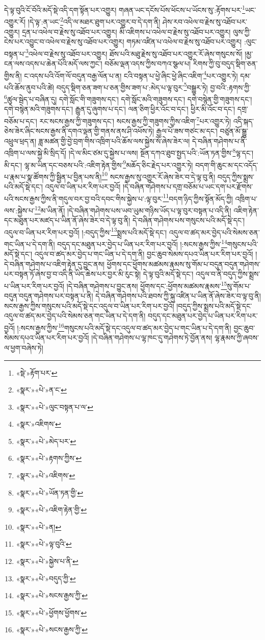 དེ་ལྟ་བུའི་ངོ་བོའི་མདོ་སྡེ་འདི་དག་སྟོན་པར་འགྱུར། གཞན་ཡང་དངོས་པོས་ཕོངས་པ་ཡོངས་སུ་:རྟོགས་པར་\footnote{«སྡེ་»རྟོག་པར་}ཡང་འགྱུར་རོ། །དེ་ལྟ་:ན་ཡང་\footnote{«སྣར་»«པེ་»ན་ང་}འདི་ལ་མཐར་ཐུག་པར་འགྱུར་བ་དེ་དག་ནི། ཤེས་རབ་འཕེལ་བ་རྗེས་སུ་འཐོབ་པར་འགྱུར། དྲན་པ་འཕེལ་བ་རྗེས་སུ་འཐོབ་པར་འགྱུར། མི་འཇིགས་པ་འཕེལ་བ་རྗེས་སུ་འཐོབ་པར་འགྱུར། ལུས་ཀྱི་ངེས་པར་འབྱུང་བ་འཕེལ་བ་རྗེས་སུ་འཐོབ་པར་འགྱུར། གཏམ་འཛིན་པ་འཕེལ་བ་རྗེས་སུ་འཐོབ་པར་འགྱུར། :ལུང་བསྟན་པ་\footnote{«སྣར་»«པེ་»ལུང་བསྟན་པ་ལ་}འཕེལ་བ་རྗེས་སུ་འཐོབ་པར་འགྱུར། ཐོས་པའི་མཐུ་རྗེས་སུ་འཐོབ་པར་འགྱུར་རོ་ཞེས་གསུངས་སོ། །མྱ་ངན་ལས་འདས་པ་ཆེན་པོའི་མདོ་ལས་ཀྱང་། བཅོམ་ལྡན་འདས་ཀྱིས་བཀའ་སྩལ་པ། རིགས་ཀྱི་བུ་བདུད་སྡིག་ཅན་གྱིས་ནི། ང་འདས་པའི་འོག་ལོ་བདུན་བརྒྱ་ལོན་པ་ན། ངའི་བསྟན་པ་ཕྱེ་ཞིང་ཕྱེ་ཞིང་འཇིག་\footnote{«སྣར་»འཇིགས་}པར་འགྱུར་ཏེ། དམ་པའི་ཆོས་ནུབ་པའི་ཚེ། བདུད་སྡིག་ཅན་ཟག་པ་ཅན་གྱིས་ཟག་པ་:མེད་པ་ལྟ་བུར་\footnote{«སྣར་»«པེ་»མེད་པར་}བསྒྱུར་ཏེ། བྱ་བའི་:རྟགས་ཀྱི་\footnote{«སྣར་»«པེ་»རྟགས་ཀྱིས་}ཚུལ་སྦེད་པ་བཞིན་དུ། དགེ་སློང་གི་གཟུགས་དང་། དགེ་སློང་མའི་གཟུགས་དང་། དགེ་བསྙེན་གྱི་གཟུགས་དང་། དགེ་བསྙེན་མའི་གཟུགས་དང་། རྒྱུན་དུ་ཞུགས་པ་དང་། ལན་ཅིག་ཕྱིར་འོང་བ་དང་། ཕྱིར་མི་འོང་བ་དང་། དགྲ་བཅོམ་པ་དང་། རང་སངས་རྒྱས་ཀྱི་གཟུགས་དང་། སངས་རྒྱས་ཀྱི་གཟུགས་ཀྱིས་འཇིག་\footnote{«སྣར་»«པེ་»འཇིགས་}པར་འགྱུར་ཏེ། འདི་སྐད་ཅེས་ཟེར་ཞིང་སངས་རྒྱས་ནི་དགའ་ལྡན་གྱི་གནས་ནས་ཤི་འཕོས་ཏེ། རྒྱལ་པོ་ཟས་གཙང་མ་དང་། བཙུན་མོ་སྒྱུ་འཕྲུལ་ཕྲད་ན། ཟླ་མཚན་གྱི་བྱེ་བྲག་གིས་འཁྲིག་པའི་ཆོས་ལས་སྐྱེས་སོ་ཞེས་ཟེར་ལ། དེ་བཞིན་གཤེགས་པ་ནི་འཁྲིག་པ་ལས་སྐྱེ་མི་སྲིད་དོ། །དེ་ལ་མིང་ཙམ་དུ་སྐྱེས་པ་ལས། སྔོན་དཀའ་ཐུབ་སྤྱད་པའི་:ཡོན་ཏན་གྱིས་\footnote{«སྣར་»«པེ་»ཡོན་ཏན་གྱི་}ལྷ་དང་། མི་དང་། ལྷ་མ་ཡིན་དང་བཅས་པའི་:འཇིག་རྟེན་གྱིས་\footnote{«སྣར་»«པེ་»འཇིག་རྟེན་གྱི་}མཆོད་ཅིང་རྗེད་པར་འགྱུར་ཏེ། བདག་གི་ཆུང་མ་དང་འདོད་པ་རྣམ་པ་སྣ་ཚོགས་ཀྱི་སྦྱིན་པ་བྱིན་པས་ནི།\footnote{«སྣར་»«པེ་»ན།} སངས་རྒྱས་སུ་འགྱུར་རོ་ཞེས་ཟེར་བ་དེ་ལྟ་བུ་ནི། བདུད་ཀྱིས་སྨྲས་པའི་མདོ་སྡེ་དང་། འདུལ་བ་ཡིན་པར་རིག་པར་བྱའོ། །དེ་བཞིན་གཤེགས་པ་དགྲ་བཅོམ་པ་ཡང་དག་པར་རྫོགས་པའི་སངས་རྒྱས་ཀྱིས་ནི་གདུལ་བར་བྱ་བའི་དབང་གིས་སྐྱེས་པ་:ལྟ་བུར་\footnote{«སྣར་»«པེ་»ལྟ་བུའི་}བདག་ཉིད་ཀྱིས་སྟོན་མོད་ཀྱི། འཁྲིག་པ་ལས་:སྐྱེས་པ་\footnote{«སྣར་»«པེ་»སྐྱེས་པ་ནི་}མ་ཡིན་ནོ། །དེ་བཞིན་གཤེགས་པས་ཡབ་ཡུམ་གཉིས་ཡོད་པ་ལྟ་བུར་བསྟན་པ་འདི་ནི། འཇིག་རྟེན་དང་མཐུན་པར་མཛད་པ་ཡིན་ནོ་ཞེས་ཟེར་བ་དེ་ལྟ་བུ་ནི། དེ་བཞིན་གཤེགས་པས་གསུངས་པའི་མདོ་སྡེ་དང་། འདུལ་བ་ཡིན་པར་རིག་པར་བྱའོ། །:བདུད་ཀྱིས་\footnote{«སྣར་»«པེ་»བདུད་ཀྱི་}སྨྲས་པའི་མདོ་སྡེ་དང་། འདུལ་བ་ཚད་མར་བྱེད་པའི་སེམས་ཅན་གང་ཡིན་པ་དེ་དག་ནི། བདུད་དང་མཐུན་པར་བྱེད་པ་ཡིན་པར་རིག་པར་བྱའོ། །:སངས་རྒྱས་ཀྱིས་\footnote{«སྣར་»«པེ་»སངས་རྒྱས་ཀྱི་}གསུངས་པའི་མདོ་སྡེ་དང་། འདུལ་བ་ཚད་མར་བྱེད་པ་གང་ཡིན་པ་དེ་དག་ནི། བྱང་ཆུབ་སེམས་དཔའ་ཡིན་པར་རིག་པར་བྱའོ། །དེ་བཞིན་གཤེགས་པ་འཇིག་རྟེན་དུ་བྱུང་ནས། ཕྱོགས་དང་ཕྱོགས་མཚམས་རྣམས་སུ་གོམ་པ་བདུན་བདུན་གཤེགས་པར་བསྟན་ཏོ་ཞེས་བྱ་བ་འདི་ནི་ཡིད་ཆེས་པར་བྱར་མི་རུང་སྟེ། དེ་ལྟ་བུའི་མདོ་སྡེ་དང་། འདུལ་བ་ནི་བདུད་ཀྱིས་སྨྲས་པ་ཡིན་པར་རིག་པར་བྱའོ། །དེ་བཞིན་གཤེགས་པ་བྱུང་ནས། ཕྱོགས་དང་:ཕྱོགས་མཚམས་རྣམས་\footnote{«སྣར་»«པེ་»ཕྱོགས་ཕྱོགས་}སུ་གོམ་པ་བདུན་བདུན་གཤེགས་པར་བསྟན་པ་ནི། དེ་བཞིན་གཤེགས་པའི་ཐབས་ཀྱི་སྐུ་འཛིན་པ་ཡིན་ནོ་ཞེས་ཟེར་བ་ལྟ་བུ་ནི། སངས་རྒྱས་ཀྱིས་གསུངས་པའི་མདོ་སྡེ་དང་འདུལ་བ་ཡིན་པར་རིག་པར་བྱའོ། །བདུད་ཀྱིས་སྨྲས་པའི་མདོ་སྡེ་དང་འདུལ་བ་ཚད་མར་བྱེད་པའི་སེམས་ཅན་གང་ཡིན་པ་དེ་དག་ནི། བདུད་དང་མཐུན་པར་བྱེད་པ་ཡིན་པར་རིག་པར་བྱའོ། །:སངས་རྒྱས་ཀྱིས་\footnote{«སྣར་»«པེ་»སངས་རྒྱས་ཀྱི་}གསུངས་པའི་མདོ་སྡེ་དང་འདུལ་བ་ཚད་མར་བྱེད་པ་གང་ཡིན་པ་དེ་དག་ནི། བྱང་ཆུབ་སེམས་དཔའ་ཡིན་པར་རིག་པར་བྱའོ། །དེ་བཞིན་གཤེགས་པ་ལྷ་ཁང་དུ་གཤེགས་ཏེ་བྱོན་ནས། ལྷ་རྣམས་ཀྱི་ཞབས་ལ་ཕྱག་བཞེས་ཏེ། 